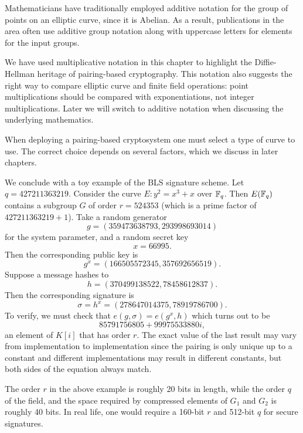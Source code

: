 Mathematicians have traditionally employed additive notation for the
group of points on an elliptic curve, since it is
Abelian. As a result, publications in the area often use additive group
notation along with uppercase letters for elements for the input groups.

We have used multiplicative notation in this chapter to highlight the
Diffie-Hellman heritage of pairing-based cryptography. This notation also
suggests the right way to compare elliptic curve and finite field operations:
point multiplications should be compared with exponentiations, not
integer multiplications. Later we will switch to additive notation when
discussing the underlying mathematics.

When deploying a pairing-based cryptosystem one must select a type of
curve to use. The correct choice depends on several factors,
which we discuss in later chapters.

We conclude with a toy example of the BLS signature scheme.
Let $q = 427211363219$.
Consider the curve $E : y^2 = x^3 + x$ over
$\mathbb{F}_q$. Then $E(\mathbb{F}_q)$ contains a subgroup
$G$ of order $r = 524353$ (which is a prime factor of $427211363219 + 1$).
Take a random generator
\[ g = (359473638793, 293998693014) \]
for the system parameter, and a random secret key
\[ x = 66995 . \]
Then the corresponding public key is
\[ g^x = (166505572345, 357692656519) . \]
Suppose a message hashes to
\[ h = (370499138522, 78458612837) . \]
Then the corresponding signature is
\[ \sigma = h^x = (278647014375, 78919786700) . \]
To verify, we must check that $e(g, \sigma) = e(g^x , h)$
which turns out to be
\[ 85791756805 + 99975533880i , \]
an element of $K[i]$ that has order $r$.
The exact value of the last result may vary
from implementation to implementation since the pairing is only unique up to a
constant and different implementations may result in different constants,
but both sides of the equation always match.

The order $r$ in the above example is roughly 20 bits in length,
while the order $q$ of the field, and the space required by
compressed elements of $G_1$ and $G_2$ is roughly 40 bits. In real life,
one would require a 160-bit $r$ and 512-bit $q$
for secure signatures.
